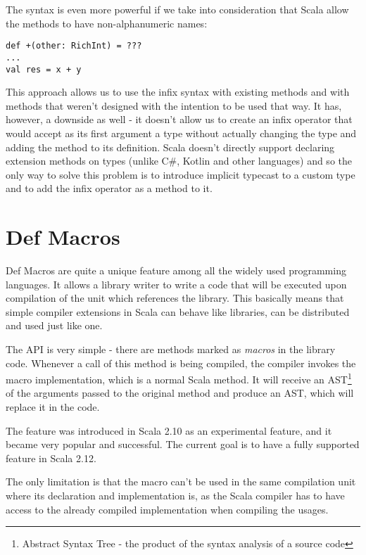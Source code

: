 The syntax is even more powerful if we take into consideration that Scala allow the methods to have non-alphanumeric names:

\lstset{style=Scala}
\begin{lstlisting}
def +(other: RichInt) = ???
...
val res = x + y
\end{lstlisting}

This approach allows us to use the infix syntax with existing methods and with methods that weren't designed with the intention to be used that way. It has, however, a downside as well - it doesn't allow us to create an infix operator that would accept as its first argument a type without actually changing the type and adding the method to its definition. Scala doesn't directly support declaring extension methods on types (unlike C\#, Kotlin and other languages) and so the only way to solve this problem is to introduce implicit typecast to a custom type and to add the infix operator as a method to it.


\section{Def Macros}
\label{sec:defmacros}

Def Macros are quite a unique feature among all the widely used programming languages. It allows a library writer to write a code that will be executed upon compilation of the unit which references the library. This basically means that simple compiler extensions in Scala can behave like libraries, can be distributed and used just like one.

The API is very simple - there are methods marked as \textit{macros} in the library code. Whenever a call of this method is being compiled, the compiler invokes the macro implementation, which is a normal Scala method. It will receive an AST\footnote{Abstract Syntax Tree - the product of the syntax analysis of a source code} of the arguments passed to the original method and produce an AST, which will replace it in the code.

The feature was introduced in Scala 2.10 as an experimental feature, and it became very popular and successful. The current goal is to have a fully supported feature in Scala 2.12.


The only limitation is that the macro can't be used in the same compilation unit where its declaration and implementation is, as the Scala compiler has to have access to the already compiled implementation when compiling the usages.

